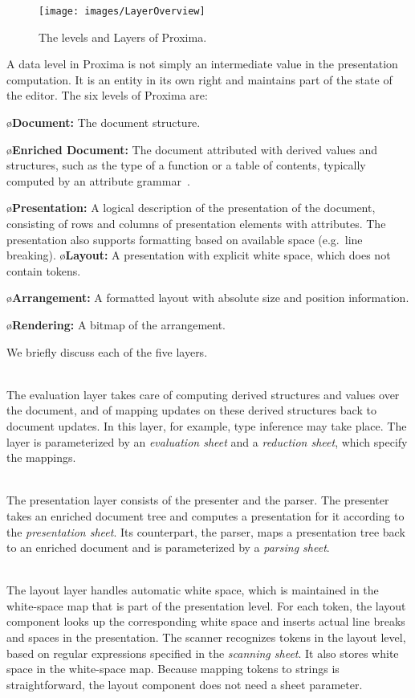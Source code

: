 \documentclass{article}[10pt]
\begin{document}
\begin{figure}[ht]
\centering
\texttt{[image: images/LayerOverview]}
\caption{The levels and Layers of Proxima.}
\label{fig:levelsAndLayers}
\end{figure}

A data level in Proxima is not simply an intermediate value in the presentation computation. It is an entity in its own right and maintains part of the state of the editor. The six levels of Proxima are:


\bl
\o {\bf Document:} The document structure.

\o {\bf Enriched Document:} The document attributed with derived values and structures, such as the type of a function or a table of contents, typically computed by an attribute grammar~\cite{reps84synGen}.

\o{\bf Presentation:} A logical description of the presentation of the document, consisting of rows and columns of presentation elements with attributes. The presentation also supports formatting based on available space (e.g.\ line breaking).
\o{\bf Layout:} A presentation with explicit white space, which does not contain tokens.

\o{\bf Arrangement:} A formatted layout with absolute size and position information.

\o{\bf Rendering:} A bitmap of the arrangement.
\el


\bc
We briefly discuss each of the five layers.

\\
The evaluation layer takes care of computing derived structures and values over the document, and of mapping updates on these derived structures back to document updates. In this layer, for example, type inference may take place. The layer is parameterized by an {\em evaluation sheet} and a {\em reduction sheet}, which specify the mappings. 

\\
The presentation layer consists of the presenter and the parser. The presenter takes an enriched document tree and computes a presentation for it according to the {\em presentation sheet}. Its counterpart, the parser, maps a presentation tree back to an enriched document and is parameterized by a {\em parsing sheet}.

\\
The layout layer handles automatic white space, which is maintained in the white-space map that is part of the presentation level. For each token, the layout component looks up the corresponding white space and inserts actual line breaks and spaces in the presentation. The scanner recognizes tokens in the layout level, based on regular expressions specified in the {\em scanning sheet}. It also stores white space in the white-space map. Because mapping tokens to strings is straightforward, the layout component does not need a sheet parameter.
\end{document}
